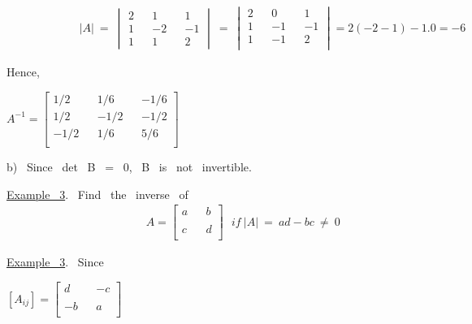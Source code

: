 \documentclass[11pt]{amsbook}
\begin{document}
\begin{align*}
	\qquad &&&&& |A| \ = \
	\begin{vmatrix}
		2  &&   1    &&  1\\
		1  &&   -2    &&   -1\\
		1  &&   1    &&  2
	\end{vmatrix} \ = \
	\begin{vmatrix}
		2  &&   0    &&  1\\
		1  &&   -1    &&   -1\\
		1  &&   -1    &&  2\\
	\end{vmatrix}=
	2(-2-1) -1.0 =-6
\end{align*}
\begin{flushleft}
	Hence,
\end{flushleft}

\begin{center}
$ A^{-1} = 
$$
\begin{bmatrix}

	1/2  && 1/6       &&   -1/6\\
	1/2  &&   -1/2    &&   -1/2\\
	-1/2  &&   1/6    &&   5/6\\

\end{bmatrix}
 $$
 $
\end{center}

\setlength{\parindent}{3ex}
 
 b) \ Since \ det \  B \ = \ 0, \  B \ is \ not \ invertible. 
\vspace{0.1cm}

\underline{Example \ 3}.  \ Find \ the \ inverse \ of \\
\begin{align*}   
     &&&&&&&   A=
         \begin{bmatrix}
    		 a  &&   b      \\
         	\\
         	c  &&   d      \\
         \end{bmatrix} 
\ \ \ if \ |A| \ = \ ad-bc \ \neq \ 0
\end{align*}




\underline{Example \ 3}. \ Since
\begin{center}
$ [A_{ij}] = 
$$
	\begin{bmatrix}

		d  &&   -c      \\
		\\
		-b  &&   a      \\ 

	\end{bmatrix}
 $$ 
 $
 \end{center}
 
\end{document}
